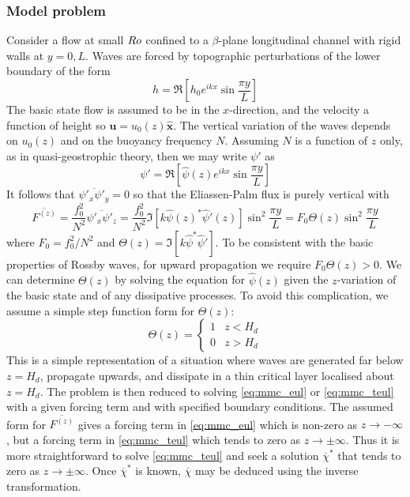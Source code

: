 \documentclass{jknotes}
\begin{document}
\subsubsection{Model problem}
Consider a flow at small $Ro$ confined to a $\beta$-plane longitudinal
channel with rigid walls at $y=0, L$. Waves are forced by topographic
perturbations of the lower boundary of the form 
\begin{equation}
	h = \Re\left[ h_0 e^{ikx} \sin \frac{\pi y}{L}\right]
\end{equation}
The basic state flow is assumed to be in the $x$-direction, and the velocity a
function of height so $\symbf{u}= u_0(z)\symbf{\hat{x}}$. The vertical
variation of the waves depends on $u_0(z)$ and on the buoyancy frequency $N$.
Assuming $N$ is a function of $z$ only, as in quasi-geostrophic theory, then
we may write $\psi'$ as
\begin{equation}
	\psi' = \Re\left[ \hat{\psi}(z) e^{ikx} \sin \frac{\pi y}{L}\right]
\end{equation}
It follows that $\overline{\psi'_x\psi'_y} = 0$ so that the Eliassen-Palm flux
is purely vertical with
\begin{equation}
	\overline{F^{(z)}} = \frac{f_0^2}{N^2} \overline{\psi'_x\psi'_z} =
	\frac{f_0^2}{N^2} \Im \left[ k \hat{\psi}(z)^* \hat{\psi}'(z)\right]
	\sin^2 \frac{\pi y}{L} = F_0 \Theta(z) \sin^2 \frac{\pi y}{L}
\end{equation}
where $F_0 = f_0^2/N^2$ and $\Theta(z) = \Im \left[ k
\hat{\psi}^*\hat{\psi}'\right]$. To be consistent with the basic properties of
Rossby waves, for upward propagation we require $F_0 \Theta(z) > 0$. We can
determine $\Theta(z)$ by solving the equation for $\hat{\psi}(z)$ given the
$z$-variation of the basic state and of any dissipative processes. To avoid
this complication, we assume a simple step function form for $\Theta(z)$:
\begin{equation}
	\Theta(z) = \begin{cases} 1 & z < H_d \\ 0 & z > H_d \end{cases}
\end{equation}
This is a simple representation of a situation where waves are generated far
below $z=H_d$, propagate upwards, and dissipate in a thin critical layer
localised about $z=H_d$. The problem is then reduced to solving
\eqref{eq:mmc_eul} or \eqref{eq:mmc_teul} with a given forcing term and with
specified boundary conditions. The assumed form for $\overline{F^{(z)}}$ gives
a forcing term in \eqref{eq:mmc_eul} which is non-zero as $z \to -\infty$, but
a forcing term in \eqref{eq:mmc_teul} which tends to zero as $z \to \pm
\infty$. Thus it is more straightforward to solve \eqref{eq:mmc_teul} and seek
a solution $\overline{\chi}^*$ that tends to zero as $z \to \pm \infty$.
Once $\overline{\chi}^*$ is known, $\overline{\chi}$ may be deduced using the
inverse transformation.
\end{document}
